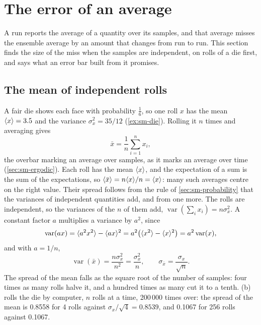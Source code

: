 \section{The error of an average}
\label{sec:cv-mean}

A run reports the average of a quantity over its samples, and that average
misses the ensemble average by an amount that changes from run to run.
This section finds the size of the miss when the samples are independent,
on rolls of a die first, and says what an error bar built from it
promises.

\subsection*{The mean of independent rolls}

A fair die shows each face with probability $\frac16$, so one roll $x$ has
the mean $\langle x \rangle = 3.5$ and the variance $\sigma_x^2 = 35/12$
(\cref{ex:sm-die}). Rolling it $n$ times and averaging gives
\begin{equation*}
   \bar x = \frac1n\sum_{i=1}^nx_i ,
\end{equation*}
the overbar marking an average over samples, as it marks an average over
time (\cref{sec:sm-ergodic}). Each roll has the mean $\langle x \rangle$, and the
expectation of a sum is the sum of the expectations, so $\langle \bar x \rangle =
n\langle x \rangle/n = \langle x \rangle$: many such averages centre on the right value.
Their spread follows from the rule of \cref{sec:sm-probability} that the
variances of independent quantities add, and from one more. The rolls are
independent, so the variances of the $n$ of them add,
$\operatorname{var}(\sum_ix_i) = n\sigma_x^2$. A constant factor $a$
multiplies a variance by $a^2$, since
\begin{equation*}
   \operatorname{var}(ax) = \langle a^2x^2 \rangle - \langle ax \rangle^2
   = a^2\bigl(\langle x^2 \rangle - \langle x \rangle^2\bigr) = a^2\operatorname{var}(x) ,
\end{equation*}
and with $a = 1/n$,
\begin{equation}
   \operatorname{var}(\bar x) = \frac{n\sigma_x^2}{n^2}
   = \frac{\sigma_x^2}{n} , \qquad
   \sigma_{\bar x} = \frac{\sigma_x}{\sqrt n} .
   \label{eq:cv-mean}
\end{equation}
The spread of the mean falls as the square root of the number of samples:
four times as many rolls halve it, and a hundred times as many cut it to a
tenth. (b) rolls the die by computer, $n$ rolls at a
time, 200\,000 times over: the spread of the mean is 0.8558 for 4 rolls
against $\sigma_x/\sqrt4 = 0.8539$, and 0.1067 for 256 rolls against
0.1067.

